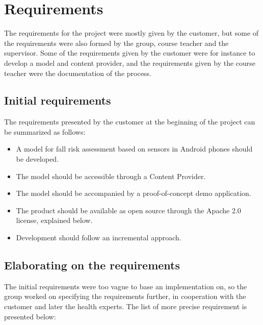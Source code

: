 \chapter{Requirements}
The requirements for the project were mostly given by the customer, but some of the requirements were also formed by the group, course teacher and the supervisor. Some of the requirements given by the customer were for instance to develop a model and content provider, and the requirements given by the course teacher were the documentation of the process. 

\section{Initial requirements}
The requirements presented by the customer at the beginning of the project can be summarized as follows:

\begin{itemize}
\item A model for fall risk assessment based on sensors in Android phones should be developed.
\item The model should be accessible through a Content Provider.
\item The model should be accompanied by a proof-of-concept demo application.
\item The product should be available as open source through the Apache 2.0 license, explained below.
\item Development should follow an incremental approach.
\end{itemize}

\section{Elaborating on the requirements}
The initial requirements were too vague to base an implementation on, so the group worked on specifying the requirements further, in cooperation with the customer and later the health experts. The list of more precise requirement is presented below:


